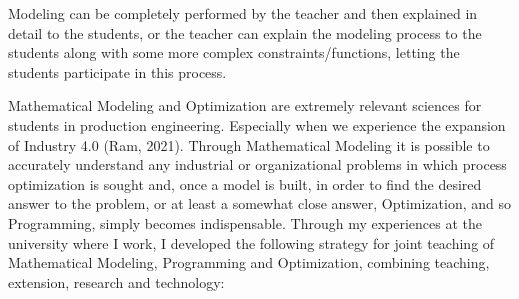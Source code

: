 \documentclass[preprint,12pt,authoryear]{elsarticle}
\begin{document}
Modeling can be completely performed by the teacher and then explained in detail to the students, or the teacher can explain the modeling process to the students along with some more complex constraints/functions, letting the students participate in this process.


Mathematical Modeling and Optimization are extremely relevant sciences for students in production engineering. Especially when we experience the expansion of Industry 4.0 (Ram, 2021). Through Mathematical Modeling it is possible to accurately understand any industrial or organizational problems in which process optimization is sought and, once a model is built, in order to find the desired answer to the problem, or at least a somewhat close answer, Optimization, and so Programming, simply becomes indispensable. Through my experiences at the university where I work, I developed the following strategy for joint teaching of
Mathematical Modeling, Programming and Optimization, combining teaching, extension, research and technology:
\end{document}
